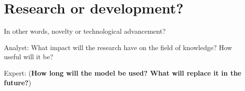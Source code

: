 \documentclass[12pt]{article}
\begin{document}
\section{Research or development?}
In other words, novelty or technological advancement?

{Analyst:} What impact will the research have on the field of knowledge? How useful will it be?

{Expert:} (\textbf{How long will the model be used? What will replace it in the future?})

%
%
\end{document}
